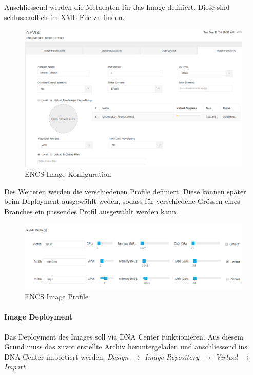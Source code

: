Anschliessend werden die Metadaten für das Image definiert. Diese sind schlussendlich im XML File zu finden.

\begin{figure}[H]
	\centering
	\includegraphics[width=0.8\linewidth]{img/Absicherung/ENCS-Image-Creation.png}
	\caption{ENCS Image Konfiguration}
	\label{fig:ENCS Image Konfiguration}
\end{figure}

Des Weiteren werden die verschiedenen Profile definiert. Diese können später beim Deployment ausgewählt weden, sodass für verschiedene Grössen eines Branches ein passendes Profil ausgewählt werden kann.

\begin{figure}[H]
	\centering
	\includegraphics[width=0.8\linewidth]{img/Absicherung/ENCS-Image-Profile.png}
	\caption{ENCS Image Profile}
	\label{fig:ENCS Image Profile}
\end{figure}

\paragraph{Image Deployment}

Das Deployment des Images soll via DNA Center funktionieren. Aus diesem Grund muss das zuvor erstellte Archiv heruntergeladen und anschliessend ins DNA Center importiert werden. \textit{Design $\rightarrow$ Image Repository $\rightarrow$ Virtual $\rightarrow$ Import}

